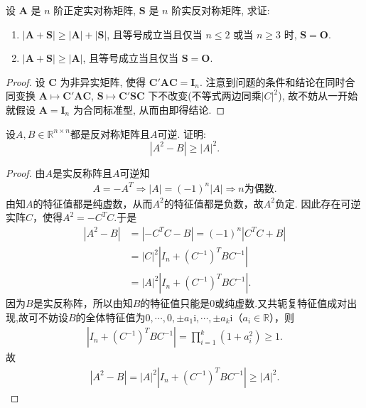 \documentclass[../../main.tex]{subfiles}
\begin{document}
\begin{proposition}\label{proposition:A+S的行列式的相关结论}
设 \(\boldsymbol{A}\) 是 \(n\) 阶正定实对称矩阵, \(\boldsymbol{S}\) 是 \(n\) 阶实反对称矩阵, 求证:
\begin{enumerate}[(1)]
\item \(|\boldsymbol{A}+\boldsymbol{S}|\geqslant |\boldsymbol{A}|+|\boldsymbol{S}|\), 且等号成立当且仅当 \(n\leqslant 2\) 或当 \(n\geqslant 3\) 时, \(\boldsymbol{S}=\boldsymbol{O}\).
\item \(|\boldsymbol{A}+\boldsymbol{S}|\geqslant |\boldsymbol{A}|\), 且等号成立当且仅当 \(\boldsymbol{S}=\boldsymbol{O}\).
\end{enumerate}
\end{proposition}
\begin{proof}
设 \(\boldsymbol{C}\) 为非异实矩阵, 使得 \(\boldsymbol{C}'\boldsymbol{A}\boldsymbol{C}=\boldsymbol{I}_n\). 注意到问题的条件和结论在同时合同变换 \(\boldsymbol{A}\mapsto\boldsymbol{C}'\boldsymbol{A}\boldsymbol{C}\), \(\boldsymbol{S}\mapsto\boldsymbol{C}'\boldsymbol{S}\boldsymbol{C}\) 下不改变(不等式两边同乘$|C|^2$), 故不妨从一开始就假设 \(\boldsymbol{A}=\boldsymbol{I}_n\) 为合同标准型, 从而由即得结论. 

\end{proof}

\begin{example}
设$A,B \in \mathbb{R}^{n \times n}$都是反对称矩阵且$A$可逆. 证明:
$$|A^2 - B| \geqslant |A|^2.$$
\end{example}
\begin{proof}
由$A$是实反称阵且$A$可逆知
\begin{align*}
A=-A^T\Longrightarrow |A|=(-1)^n|A|\Longrightarrow n\text{为偶数}.
\end{align*}
由知$A$的特征值都是纯虚数，从而$A^2$的特征值都是负数，故$A^2$负定.
因此存在可逆实阵$C$，使得$A^2=-C^TC$.于是
\begin{align*}
|A^2-B|&=|-C^TC-B|=(-1)^n|C^TC+B|\\
&=|C|^2|I_n+(C^{-1})^TBC^{-1}|\\
&=|A|^2|I_n+(C^{-1})^TBC^{-1}|.
\end{align*}
因为$B$是实反称阵，所以由知$B$的特征值只能是$0$或纯虚数.又共轭复特征值成对出现,故可不妨设$B$的全体特征值为$0,\cdots,0,\pm a_1\mathrm{i},\cdots,\pm a_k\mathrm{i}$（$a_i\in\mathbb{R}$），则
\begin{align*}
|I_n+(C^{-1})^TBC^{-1}|=\prod_{i=1}^k(1+a_i^2)\geqslant1.
\end{align*}
故
\begin{align*}
|A^2-B|=|A|^2|I_n+(C^{-1})^TBC^{-1}|\geqslant|A|^2.
\end{align*}
\end{proof}
\end{document}
